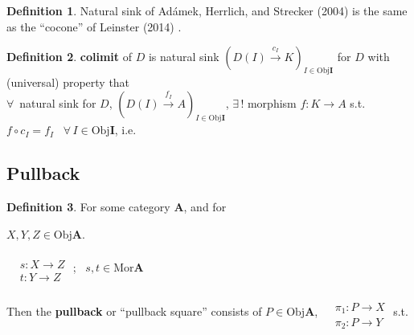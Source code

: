 \documentclass[twoside,landscape,10pt]{amsart}
\theoremstyle{plain}
\theoremstyle{definition}
\newtheorem{definition}{Definition}
\theoremstyle{remark}
\begin{document}
\begin{multicols*}{2}
\begin{definition}
Natural sink of Ad\'{a}mek, Herrlich, and Strecker (2004) \cite{AHS2004} is the same as the ``cocone'' of Leinster (2014) \cite{Lein2014}.  

\end{definition}

\begin{definition}
  \textbf{colimit} of $D$ is natural sink $(D(I) \xrightarrow{ c_I} K)_{I \in \text{Obj}\mathbf{I}}$ for $D$ with \\
(universal) property that \\
$\forall \, $ natural sink for $D$, $(D(I) \xrightarrow{ f_I} A)_{I\in \text{Obj}\mathbf{I}}$, $\exists \, !$ morphism $f:K \to A$ s.t. $f\circ c_I = f_I$ \quad \,  $\forall \, I \in \text{Obj}\mathbf{I}$, i.e.

\end{definition}

\subsection{Pullback}

\begin{definition}
  For some category $\mathbf{A}$, and for 


$X,Y,Z \in \text{Obj}\mathbf{A}$.  

$\begin{aligned} & \quad \\
  & s : X \to Z \\
  & t: Y \to Z \end{aligned}$ ; \qquad \, $s,t \in \text{Mor}\mathbf{A}$

Then the \textbf{pullback} or ``pullback square'' consists of $P \in \text{Obj}\mathbf{A}$, $\begin{aligned} & \quad \\
  & \pi_1 : P \to X \\
  & \pi_2: P \to Y \end{aligned}$ s.t. 


\end{definition}
\end{multicols*}
\end{document}
